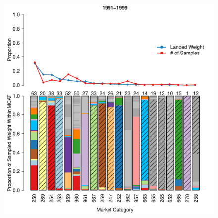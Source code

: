 \documentclass[12pt]{article}
\begin{document}
\begin{landscape}
\begin{figure}[h!]
\centering
\vspace{-1.2cm}
\includegraphics[height=\textheight]{./pictures/1991to1999Bar3.pdf}

\end{figure}
\end{landscape}
\end{document}
